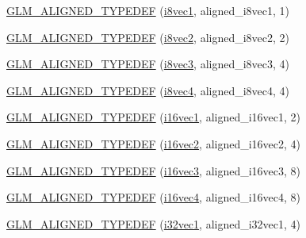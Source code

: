 \begin{DoxyCompactItemize}
\item 
\hyperlink{group__gtx__type__aligned_ga9ec20fdfb729c702032da9378c79679f}{G\+L\+M\+\_\+\+A\+L\+I\+G\+N\+E\+D\+\_\+\+T\+Y\+P\+E\+D\+E\+F} (\hyperlink{group__gtc__type__precision_ga1cb1ef0f2a9266aba88f161c9062cebc}{i8vec1}, aligned\+\_\+i8vec1, 1)
\item 
\hyperlink{group__gtx__type__aligned_ga25b3fe1d9e8d0a5e86c1949c1acd8131}{G\+L\+M\+\_\+\+A\+L\+I\+G\+N\+E\+D\+\_\+\+T\+Y\+P\+E\+D\+E\+F} (\hyperlink{group__gtc__type__precision_ga277312370b6155b37dbf2a6954c42915}{i8vec2}, aligned\+\_\+i8vec2, 2)
\item 
\hyperlink{group__gtx__type__aligned_ga2958f907719d94d8109b562540c910e2}{G\+L\+M\+\_\+\+A\+L\+I\+G\+N\+E\+D\+\_\+\+T\+Y\+P\+E\+D\+E\+F} (\hyperlink{group__gtc__type__precision_ga97a6cae79db311cdd47c4e88a5855987}{i8vec3}, aligned\+\_\+i8vec3, 4)
\item 
\hyperlink{group__gtx__type__aligned_ga1fe6fc032a978f1c845fac9aa0668714}{G\+L\+M\+\_\+\+A\+L\+I\+G\+N\+E\+D\+\_\+\+T\+Y\+P\+E\+D\+E\+F} (\hyperlink{group__gtc__type__precision_gafbf10a778016eba57d44beb585f2dc49}{i8vec4}, aligned\+\_\+i8vec4, 4)
\item 
\hyperlink{group__gtx__type__aligned_gaa4161e7a496dc96972254143fe873e55}{G\+L\+M\+\_\+\+A\+L\+I\+G\+N\+E\+D\+\_\+\+T\+Y\+P\+E\+D\+E\+F} (\hyperlink{group__gtc__type__precision_gacec84a02174e44363dd105769fb22473}{i16vec1}, aligned\+\_\+i16vec1, 2)
\item 
\hyperlink{group__gtx__type__aligned_ga9d7cb211ccda69b1c22ddeeb0f3e7aba}{G\+L\+M\+\_\+\+A\+L\+I\+G\+N\+E\+D\+\_\+\+T\+Y\+P\+E\+D\+E\+F} (\hyperlink{group__gtc__type__precision_ga37af364ff13fb791571dd324dfd3ca89}{i16vec2}, aligned\+\_\+i16vec2, 4)
\item 
\hyperlink{group__gtx__type__aligned_gaaee91dd2ab34423bcc11072ef6bd0f02}{G\+L\+M\+\_\+\+A\+L\+I\+G\+N\+E\+D\+\_\+\+T\+Y\+P\+E\+D\+E\+F} (\hyperlink{group__gtc__type__precision_ga85e903f028d903b416a1119b00af57ea}{i16vec3}, aligned\+\_\+i16vec3, 8)
\item 
\hyperlink{group__gtx__type__aligned_ga49f047ccaa8b31fad9f26c67bf9b3510}{G\+L\+M\+\_\+\+A\+L\+I\+G\+N\+E\+D\+\_\+\+T\+Y\+P\+E\+D\+E\+F} (\hyperlink{group__gtc__type__precision_gaf074450c0e60b45114084b1df4012a1d}{i16vec4}, aligned\+\_\+i16vec4, 8)
\item 
\hyperlink{group__gtx__type__aligned_ga904e9c2436bb099397c0823506a0771f}{G\+L\+M\+\_\+\+A\+L\+I\+G\+N\+E\+D\+\_\+\+T\+Y\+P\+E\+D\+E\+F} (\hyperlink{group__gtc__type__precision_ga05a766bbe2ad0791ed0081baac492da7}{i32vec1}, aligned\+\_\+i32vec1, 4)

\end{DoxyCompactItemize}
